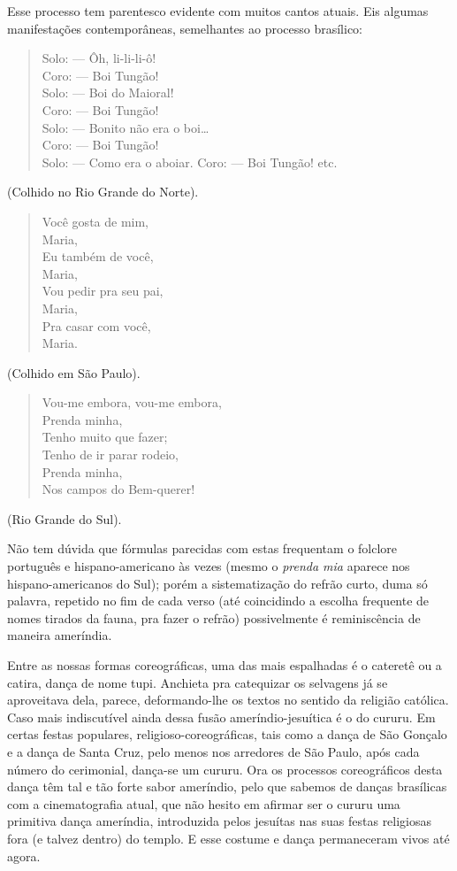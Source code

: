 Esse processo tem parentesco evidente com muitos cantos atuais. Eis
algumas manifestações contemporâneas, semelhantes ao processo brasílico:

\begin{verse}
Solo: --- Ôh, li-li-li-ô!\\
Coro: --- Boi Tungão!\\
Solo: --- Boi do Maioral!\\
Coro: --- Boi Tungão!\\
Solo: --- Bonito não era o boi\ldots{}\\
Coro: --- Boi Tungão!\\
Solo: --- Como era o aboiar. Coro: --- Boi Tungão! etc.
\end{verse}

(Colhido no Rio Grande do Norte).

\begin{verse}
Você gosta de mim,\\
Maria,\\
Eu também de você,\\
Maria,\\
Vou pedir pra seu pai,\\
Maria,\\
Pra casar com você,\\
Maria.
\end{verse}

(Colhido em São Paulo).

\begin{verse}
Vou-me embora, vou-me embora,\\
Prenda minha,\\
Tenho muito que fazer;\\
Tenho de ir parar rodeio,\\
Prenda minha,\\
Nos campos do Bem-querer!
\end{verse}

(Rio Grande do Sul).

Não tem dúvida que fórmulas parecidas com estas frequentam o folclore
português e hispano-americano às vezes (mesmo o \textit{prenda mia} aparece
nos hispano-americanos do Sul); porém a sistematização do refrão curto,
duma só palavra, repetido no fim de cada verso (até coincidindo a
escolha frequente de nomes tirados da fauna, pra fazer o refrão)
possivelmente é reminiscência de maneira ameríndia.

Entre as nossas formas coreográficas, uma das mais espalhadas é o
cateretê ou a catira, dança de nome tupi. Anchieta pra catequizar os
selvagens já se aproveitava dela, parece, deformando-lhe os textos no
sentido da religião católica. Caso mais indiscutível ainda dessa fusão
ameríndio-jesuítica é o do cururu. Em certas festas populares,
religioso-coreográficas, tais como a dança de São Gonçalo e a dança de
Santa Cruz, pelo menos nos arredores de São Paulo, após cada número do
cerimonial, dança-se um cururu. Ora os processos coreográficos desta
dança têm tal e tão forte sabor ameríndio, pelo que sabemos de danças
brasílicas com a cinematografia atual, que não hesito em afirmar ser o
cururu uma primitiva dança ameríndia, introduzida pelos jesuítas nas
suas festas religiosas fora (e talvez dentro) do templo. E esse costume
e dança permaneceram vivos até agora.


